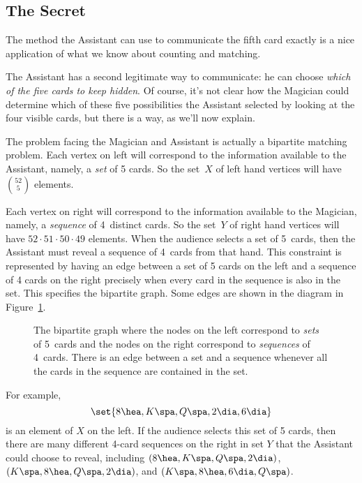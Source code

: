 \subsection{The Secret}

The method the Assistant can use to communicate the fifth card exactly is
a nice application of what we know about counting and matching.

The Assistant has a second legitimate way to communicate: he can
choose \emph{which of the five cards to keep hidden}.  Of course, it's
not clear how the Magician could determine which of these five
possibilities the Assistant selected by looking at the four visible
cards, but there is a way, as we'll now explain.

The problem facing the Magician and Assistant is actually a bipartite
matching problem.  Each vertex on left will correspond to the
information available to the Assistant, namely, a \emph{set} of 5
cards.  So the set~$X$ of left hand vertices will have $\binom{52}{5}$
elements.  

Each vertex on right will correspond to the information available to
the Magician, namely, a \emph{sequence} of 4~distinct cards.  So the
set~$Y$ of right hand vertices will have $52\cdot 51 \cdot 50 \cdot
49$ elements.  When the audience selects a set of 5~cards, then the
Assistant must reveal a sequence of 4~cards from that hand.  This
constraint is represented by having an edge between a set of 5 cards
on the left and a sequence of 4 cards on the right precisely when
every card in the sequence is also in the set.  This specifies the
bipartite graph.  Some edges are shown in the diagram in
Figure~\ref{fig:11Q9}.

\begin{figure}


\caption{The bipartite graph where the nodes on the left correspond to
  \emph{sets} of 5~cards and the nodes on the right correspond to
  \emph{sequences} of 4~cards. There is an edge between a set and a
  sequence whenever all the cards in the sequence are contained in the
  set.}

\label{fig:11Q9}

\end{figure}

For example,
\begin{equation}\label{2dia6dia}
\set{ 8 \hea, K \spa, Q \spa, 2 \dia, 6 \dia }
\end{equation}
is an element of $X$ on the left.  If the audience selects this set of 5
cards, then there are many different 4-card sequences on the right in set
$Y$ that the Assistant could choose to reveal, including $(8 \hea, K \spa,
Q \spa, 2 \dia)$, $(K \spa, 8 \hea, Q \spa, 2 \dia)$, and $(K \spa, 8
\hea, 6 \dia, Q \spa)$.

